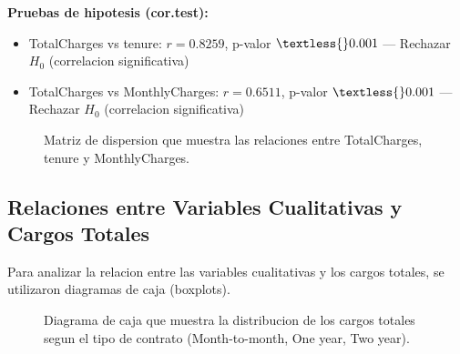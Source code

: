 \documentclass[12pt,a4paper]{article}
\begin{document}
\textbf{Pruebas de hipotesis (cor.test):}
\begin{itemize}
    \item TotalCharges vs tenure: $r = 0.8259$, p-valor $\textless{} 0.001$ --- Rechazar $H_0$ (correlacion significativa)
    \item TotalCharges vs MonthlyCharges: $r = 0.6511$, p-valor $\textless{} 0.001$ --- Rechazar $H_0$ (correlacion significativa)
\end{itemize}

\begin{figure}[H]
    \centering
    \caption{Matriz de dispersion que muestra las relaciones entre TotalCharges, tenure y MonthlyCharges.}
    \label{fig:pairs}
\end{figure}

\subsection{Relaciones entre Variables Cualitativas y Cargos Totales}

Para analizar la relacion entre las variables cualitativas y los cargos totales, se utilizaron diagramas de caja (boxplots).

\begin{figure}[H]
    \centering
    \caption{Diagrama de caja que muestra la distribucion de los cargos totales segun el tipo de contrato (Month-to-month, One year, Two year).}
    \label{fig:contract}
\end{figure}
\end{document}
